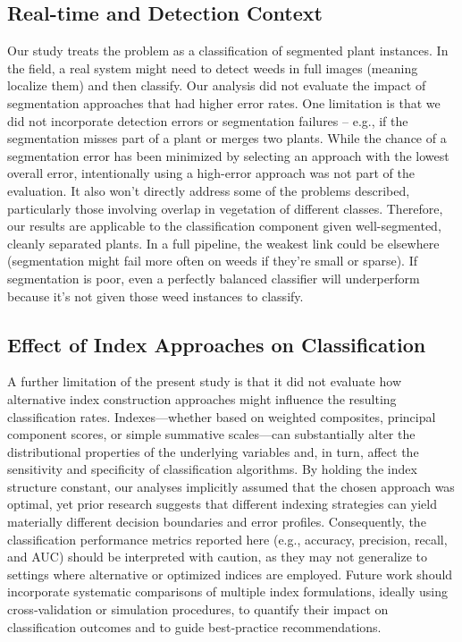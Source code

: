 \documentclass[letterpaper, notitlepage]{report}
\begin{document}
\subsection{Real-time and Detection Context}
Our study treats the problem as a classification of segmented plant instances. In the field, a real system might need to detect weeds in full images (meaning localize them) and then classify. Our analysis did not evaluate the impact of segmentation approaches that had higher error rates. One limitation is that we did not incorporate detection errors or segmentation failures – e.g., if the segmentation misses part of a plant or merges two plants. While the chance of a segmentation error has been minimized by selecting an approach with the lowest overall error, intentionally using a high-error approach was not part of the evaluation. It also won’t directly address some of the problems described, particularly those involving overlap in vegetation of different classes.  Therefore, our results are applicable to the classification component given well-segmented, cleanly separated plants. In a full pipeline, the weakest link could be elsewhere (segmentation might fail more often on weeds if they’re small or sparse). If segmentation is poor, even a perfectly balanced classifier will underperform because it’s not given those weed instances to classify. 

\subsection{Effect of Index Approaches on Classification}
A further limitation of the present study is that it did not evaluate how alternative index construction approaches might influence the resulting classification rates. Indexes---whether based on weighted composites, principal component scores, or simple summative scales---can substantially alter the distributional properties of the underlying variables and, in turn, affect the sensitivity and specificity of classification algorithms. By holding the index structure constant, our analyses implicitly assumed that the chosen approach was optimal, yet prior research suggests that different indexing strategies can yield materially different decision boundaries and error profiles. Consequently, the classification performance metrics reported here (e.g., accuracy, precision, recall, and \gls{AUC}) should be interpreted with caution, as they may not generalize to settings where alternative or optimized indices are employed. Future work should incorporate systematic comparisons of multiple index formulations, ideally using cross‑validation or simulation procedures, to quantify their impact on classification outcomes and to guide best‑practice recommendations.
\end{document}
